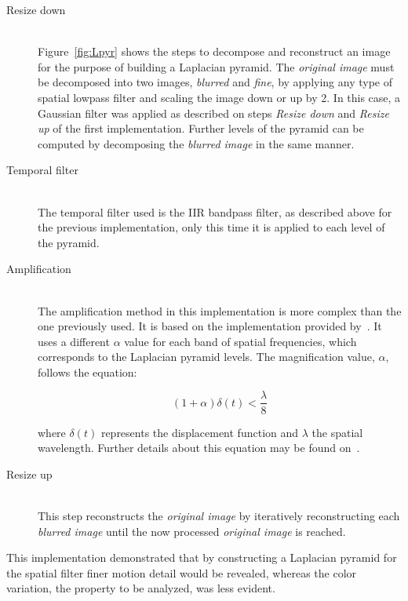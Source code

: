 \begin{description}
  \item[Resize down]\hfill\\
        Figure~\ref{fig:Lpyr} shows the steps to decompose and reconstruct
        an image for the purpose of building a Laplacian pyramid. The
        \emph{original image} must be decomposed into two images,
        \emph{blurred} and \emph{fine}, by applying any type of spatial lowpass
        filter and scaling the image down or up by 2. In this case, a
        Gaussian filter was applied as described on steps \emph{Resize down}
        and \emph{Resize up} of the first implementation. Further levels of the
        pyramid can be computed by decomposing the \emph{blurred image} in the
        same manner.

  \item[Temporal filter]\hfill\\
        The temporal filter used is the IIR bandpass filter, as described above
        for the previous implementation, only this time it is applied to each
        level of the pyramid.

  \item[Amplification]\hfill\\
        The amplification method in this implementation is more complex than
        the one previously used. It is based on the implementation provided
        by~\cite{Wu2012Eulerian}. It uses a different $\alpha$ value for each
        band of spatial frequencies, which corresponds to the Laplacian pyramid
        levels. The magnification value, $\alpha$, follows the equation:

        \begin{equation}
          (1 + \alpha) \delta(t) < \frac{\lambda}{8}
        \end{equation}

        where $\delta(t)$ represents the displacement function and $\lambda$
        the spatial wavelength. Further details about this equation may be
        found on~\cite[Section 3.2]{Wu2012Eulerian}.

  \item[Resize up]\hfill\\
        This step reconstructs the \emph{original image} by iteratively
        reconstructing each \emph{blurred image} until the now processed
        \emph{original image} is reached.
\end{description}

This implementation demonstrated that by constructing a Laplacian pyramid for
the spatial filter finer motion detail would be revealed, whereas the color
variation, the property to be analyzed, was less evident.

